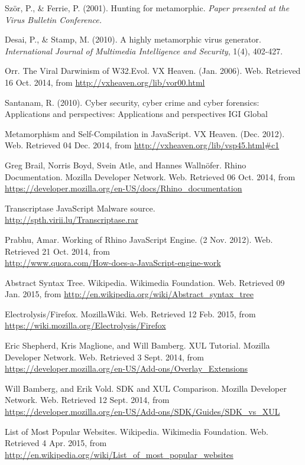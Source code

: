 \begin{thebibliography}{10}
 Ször, P., \& Ferrie, P. (2001). Hunting for metamorphic. {\it Paper presented at the Virus Bulletin Conference.}

 Desai, P., \& Stamp, M. (2010). A highly metamorphic virus generator. {\it International Journal of Multimedia Intelligence and Security}, 1(4), 402-427.

 Orr. The Viral Darwinism of W32.Evol. VX Heaven. (Jan. 2006). Web. Retrieved 16 Oct. 2014, from \url{http://vxheaven.org/lib/vor00.html}

 Santanam, R. (2010). Cyber security, cyber crime and cyber forensics: Applications and perspectives: Applications and perspectives IGI Global

 Metamorphism and Self-Compilation in JavaScript. VX Heaven. (Dec. 2012). Web. Retrieved 04 Dec. 2014, from \url{http://vxheaven.org/lib/vsp45.html#c1}

 Greg Brail, Norris Boyd, Svein Atle, and Hannes Wallnöfer. Rhino Documentation. Mozilla Developer Network. Web. Retrieved 06 Oct. 2014, from \\
\url{https://developer.mozilla.org/en-US/docs/Rhino_documentation}

 Transcriptase JavaScript Malware source. \\
\url{http://spth.virii.lu/Transcriptase.rar}

 Prabhu, Amar. Working of Rhino JavaScript Engine. (2 Nov. 2012). Web. Retrieved 21 Oct. 2014, from \\ 
\url{http://www.quora.com/How-does-a-JavaScript-engine-work}

 Abstract Syntax Tree. Wikipedia. Wikimedia Foundation. Web. Retrieved 09 Jan. 2015, from \url{http://en.wikipedia.org/wiki/Abstract_syntax_tree}

 Electrolysis/Firefox. MozillaWiki. Web. Retrieved 12 Feb. 2015, from \\
\url{https://wiki.mozilla.org/Electrolysis/Firefox}

 Eric Shepherd, Kris Maglione, and Will Bamberg. XUL Tutorial. Mozilla Developer Network. Web. Retrieved 3 Sept. 2014, from \\
\url{https://developer.mozilla.org/en-US/Add-ons/Overlay_Extensions}

 Will Bamberg, and Erik Vold. SDK and XUL Comparison. Mozilla Developer Network. Web. Retrieved 12 Sept. 2014, from \\
\url{https://developer.mozilla.org/en-US/Add-ons/SDK/Guides/SDK_vs_XUL}

 List of Most Popular Websites. Wikipedia. Wikimedia Foundation. Web. Retrieved 4 Apr. 2015, from \\
\url{http://en.wikipedia.org/wiki/List_of_most_popular_websites}

\end{thebibliography}
